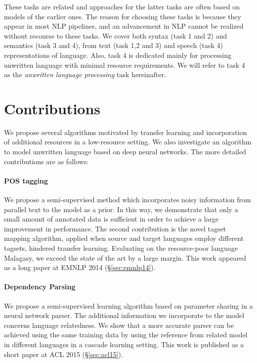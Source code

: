 \documentclass[12pt,twoside,final,hidelinks]{ltthesis}
\theoremstyle{definition}
\newcommand\emnlpiv{EMNLP 2014 (\S\ref{sec:emnlp14})}
\newcommand\aclv{ACL 2015 (\S\ref{sec:acl15})}
\begin{document}
These tasks are related and approaches for the latter tasks are often based on models of the earlier ones. 
The reason for choosing these tasks is because they appear in most NLP pipelines, and an advancement in NLP cannot be realized without recourse to these tasks. We cover both syntax (task 1 and 2) and semantics (task 3 and 4), from text (task 1,2 and 3) and speech (task 4) representations of language. Also, task 4 is dedicated mainly for processing unwritten language with minimal resource requirements. We will refer to task 4 as the \emph{unwritten language processing} task hereinafter. 

\section{Contributions}
We propose several algorithms motivated by transfer learning and incorporation of additional resources in a low-resource setting. We also investigate an algorithm to model unwritten language based on deep neural networks. The more detailed contributions are as follows:

\paragraph{POS tagging} We propose a semi-supervised method which incorporates noisy information from parallel text to the model as a prior. In this way, we 
demonstrate that only a small amount of annotated data is sufficient in order to achieve a large improvement in performance. The second contribution is the novel tagset mapping algorithm, applied when source and target languages employ different tagsets, hindered transfer learning.  Evaluating on the resource-poor language Malagasy, we exceed the state of the art by a large margin. This work appeared as a long paper at \emnlpiv. 

\paragraph{Dependency Parsing} We propose a semi-supervised learning algorithm based on parameter sharing in a neural network parser. The additional information we incorporate to the model concerns language relatedness. We show that a more accurate parser can be achieved using the same training data by using the reference from related model in different languages in a cascade learning setting. This work is published as a short paper at \aclv. 
\end{document}
